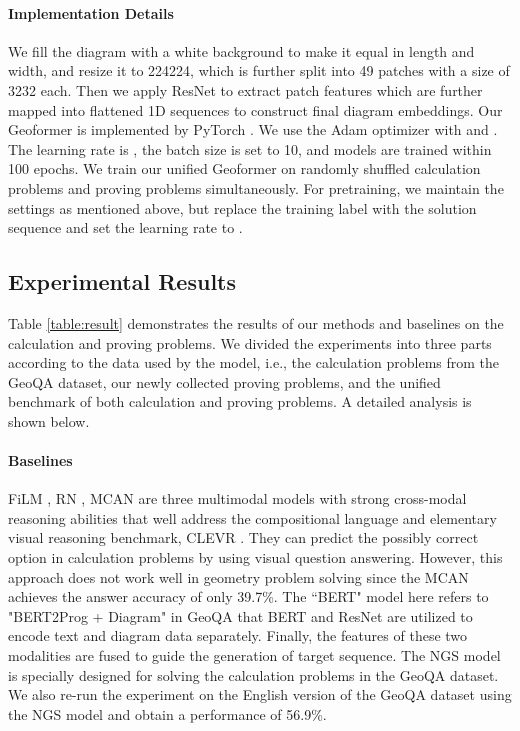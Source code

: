 \documentclass[11pt]{article}
\begin{document}
\paragraph{Implementation Details}
We fill the diagram with a white background to make it equal in length and width, and resize it to 224224, which is further split into 49 patches with a size of 3232 each.
Then we apply ResNet \cite{he2016deep} to extract patch features which are further mapped into flattened 1D sequences to construct final diagram embeddings. 
Our Geoformer is implemented by PyTorch \cite{paszke2017automatic}. We use the Adam \cite{loshchilov2017decoupled} optimizer with  and .
The learning rate is , the batch size is set to 10, and models are trained within 100 epochs.
We train our unified Geoformer on randomly shuffled calculation problems and proving problems simultaneously.
For pretraining, we maintain the settings as mentioned above, but replace the training label with the solution sequence and set the learning rate to .



\subsection{Experimental Results}
Table \ref{table:result} demonstrates the results of our methods and baselines on the calculation and proving problems. We divided the experiments into three parts according to the data used by the model, i.e., the calculation problems from the GeoQA dataset, our newly collected proving problems, and the unified benchmark of both calculation and proving problems. A detailed analysis is shown below.

\paragraph{Baselines}
FiLM \cite{perez2017film}, RN \cite{santoro2017simple}, MCAN \cite{yu2019deep} are three multimodal models with strong cross-modal reasoning abilities that well address the compositional language and elementary visual reasoning benchmark, CLEVR \cite{johnson2017clevr}. They can predict the possibly correct option in calculation problems by using visual question answering. However, this approach does not work well in geometry problem solving since the MCAN achieves the answer accuracy of only 39.7\%.
The ``BERT" model here refers to "BERT2Prog + Diagram" in GeoQA that BERT and ResNet are utilized to encode text and diagram data separately. Finally, the features of these two modalities are fused to guide the generation of target sequence.
The NGS model is specially designed for solving the calculation problems in the GeoQA dataset.
We also re-run the experiment on the English version of the GeoQA dataset using the NGS model and obtain a performance of 56.9\%.
\end{document}
